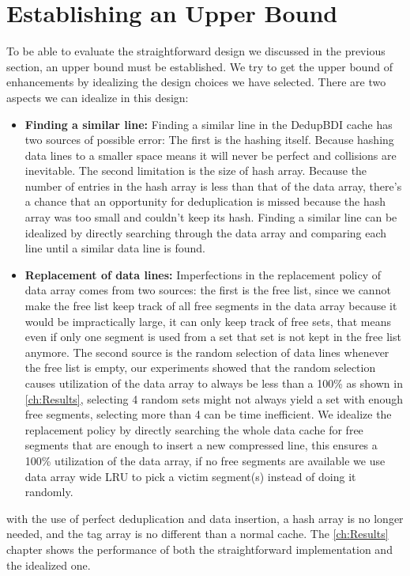\section{Establishing an Upper Bound}
\label{sec:Upper Bound}
To be able to evaluate the straightforward design we discussed in the previous section, an upper bound must be established. We try to get the upper bound of enhancements by idealizing the design choices we have selected. There are two aspects we can idealize in this design:
\begin{itemize}
    \item \textbf{Finding a similar line:} Finding a similar line in the DedupBDI cache has two sources of possible error: The first is the hashing itself. Because hashing data lines to a smaller space means it will never be perfect and collisions are inevitable. The second limitation is the size of hash array. Because the number of entries in the hash array is less than that of the data array, there's a chance that an opportunity for deduplication is missed because the hash array was too small and couldn't keep its hash. Finding a similar line can be idealized by directly searching through the data array and comparing each line until a similar data line is found.
    \item \textbf{Replacement of data lines:} Imperfections in the replacement policy of data array comes from two sources: the first is the free list, since we cannot make the free list keep track of all free segments in the data array because it would be impractically large, it can only keep track of free sets, that means even if only one segment is used from a set that set is not kept in the free list anymore. The second source is the random selection of data lines whenever the free list is empty, our experiments showed that the random selection causes utilization of the data array to always be less than a 100\% as shown in \ref{ch:Results}, selecting 4 random sets might not always yield a set with enough free segments, selecting more than 4 can be time inefficient. We idealize the replacement policy by directly searching the whole data cache for free segments that are enough to insert a new compressed line, this ensures a 100\% utilization of the data array, if no free segments are available we use data array wide LRU to pick a victim segment(s) instead of doing it randomly.
\end{itemize}
with the use of perfect deduplication and data insertion, a hash array is no longer needed, and the tag array is no different than a normal cache. The \ref{ch:Results} chapter shows the performance of both the straightforward implementation and the idealized one.



